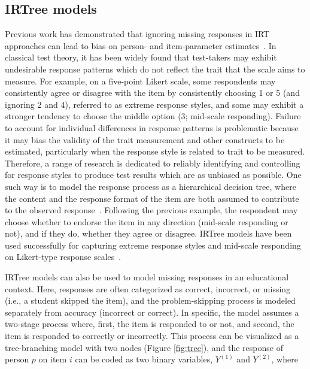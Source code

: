\documentclass[anonymous,manuscript,review]{acmart}
\begin{document}
\subsection{IRTree models}
Previous work has demonstrated that ignoring missing responses in IRT approaches can lead to bias on person- and item-parameter estimates~\cite{finch2008estimation, mislevy1996missing, pohl2014dealing, holman2005modelling, debeer2017modeling}. In classical test theory, it has been widely found that test-takers may exhibit undesirable response patterns which do not reflect the trait that the scale aims to measure. For example, on a five-point Likert scale, some respondents may consistently agree or disagree with the item by consistently choosing 1 or 5 (and ignoring 2 and 4), referred to as extreme response styles, and some may exhibit a stronger tendency to choose the middle option (3; mid-scale responding). Failure to account for individual differences in response patterns is problematic because it may bias the validity of the trait measurement and other constructs to be estimated,  particularly when the response style is related to trait to be measured. Therefore, a range of research is dedicated to reliably identifying and controlling for response styles to produce test results which are as unbiased as possible. One such way is to model the response process as a hierarchical decision tree, where the content and the response format of the item are both assumed to contribute to the observed response~\cite{bockenholt2012modeling, de2012irtrees, thissen2013two}. Following the previous example, the respondent may choose whether to endorse the item in any direction (mid-scale responding or not), and if they do, whether they agree or disagree. IRTree models have been used successfully for capturing extreme response styles and mid-scale responding on Likert-type response scales~\cite{bockenholt2017response, thissen2013two}. 

IRTree models can also be used to model missing responses in an educational context. Here, responses are often categorized as correct, incorrect, or missing (i.e., a student skipped the item), and the problem-skipping process is modeled separately from accuracy (incorrect or correct). In specific, the model assumes a two-stage process where, first, the item is responded to or not, and second, the item is responded to correctly or incorrectly. This process can be visualized as a tree-branching model with two nodes (Figure \ref{fig:tree}), and the response of person $p$ on item $i$ can be coded as two binary variables, $Y^{(1)}$ and $Y^{(2)}$, where 
\end{document}
